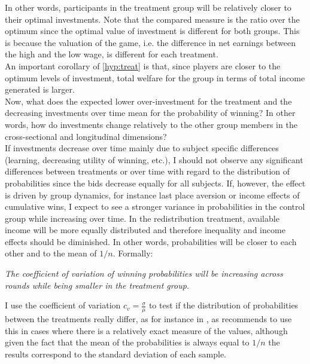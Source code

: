     In other words, participants in the treatment group will be relatively closer to their optimal investments. Note that the compared measure is the ratio over the optimum since the optimal value of investment is different for both groups. This is because the valuation of the game, i.e. the difference in net earnings between the high and the low wage, is different for each treatment.\\ 
      
    An important corollary of \cref{hyp:treat} is that, since players are closer to the optimum levels of investment, total welfare for the group in terms of total income generated is larger.\\
    
    Now, what does the expected lower over-investment for the treatment and the decreasing investments over time mean for the probability of winning? In other words, how do investments change relatively to the other group members in the cross-sectional and longitudinal dimensions?\\
    
    If investments decrease over time mainly due to subject specific differences (learning, decreasing utility of winning, etc.), I should not observe any significant differences between treatments or over time with regard to the distribution of probabilities since the bids decrease equally for all subjects. If, however, the effect is driven by group dynamics, for instance last place aversion or income effects of cumulative wins, I expect to see a stronger variance in probabilities in the control group while increasing over time. In the redistribution treatment, available income will be more equally distributed and therefore inequality and income effects should be diminished. In other words, probabilities will be closer to each other and to the mean of $1/n$. Formally:
    
    \begin{hyp}\label{hyp:wins}
    \textit{The coefficient of variation of winning probabilities will be increasing across rounds while being smaller in the treatment group.}
    \end{hyp}
    
I use the coefficient of variation $c_v=\frac{\sigma}{\mu}$ to test if the distribution of probabilities between the treatments really differ, as for instance in \cite{rassenti2000}, as \cite{bendel1989} recommends to use this in cases where there is a relatively exact measure of the values, although given the fact that the mean of the probabilities is always equal to $1/n$ the results correspond to the standard deviation of each sample.
 
